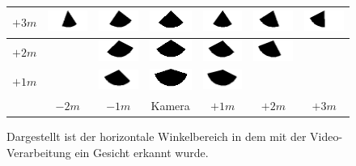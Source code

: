 \begin{figure}
\begin{tabular}{|c|c|c|c|c|c|c|}
		\hline 
		$+3m$ &
		\includegraphics[width=1.4cm]{PosWinkelVideo/Winkel_V_200_300.png}&
		\includegraphics[width=1.4cm]{PosWinkelVideo/Winkel_V_100_300.png}&
		\includegraphics[width=1.4cm]{PosWinkelVideo/Winkel_V_0_300.png}&
		\includegraphics[width=1.4cm]{PosWinkelVideo/Winkel_V_-100_300.png}&
		\includegraphics[width=1.4cm]{PosWinkelVideo/Winkel_V_-200_300.png}&
		\includegraphics[width=1.4cm]{PosWinkelVideo/Winkel_V_-300_300.png}\\ 
		\hline 
		$+2m$ & &
		\includegraphics[width=1.4cm]{PosWinkelVideo/Winkel_V_100_200.png}&
		\includegraphics[width=1.4cm]{PosWinkelVideo/Winkel_V_0_200.png}&
		\includegraphics[width=1.4cm]{PosWinkelVideo/Winkel_V_-100_200.png}&
		\includegraphics[width=1.4cm]{PosWinkelVideo/Winkel_V_-200_200.png} &\\ 
		\hline 
		$+1m$ & &
		\includegraphics[width=1.4cm]{PosWinkelVideo/Winkel_V_100_100.png}&
		\includegraphics[width=1.4cm]{PosWinkelVideo/Winkel_V_0_100.png}&
		\includegraphics[width=1.4cm]{PosWinkelVideo/Winkel_V_-100_100.png}& &\\ 
		\hline 
		& $-2m$ & $-1m$ &Kamera& $+1m$ & $+2m$ & $+3m$ \\ 
		\hline 
	\end{tabular}
	\caption{Dargestellt ist der horizontale Winkelbereich in dem mit der Video-Verarbeitung ein Gesicht erkannt wurde.}
	\label{graph_Test_Video}
\end{figure}
